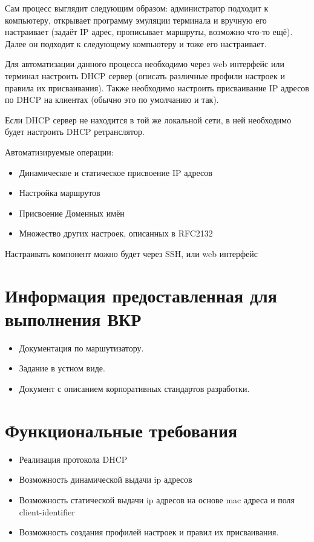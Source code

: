 \documentclass[12pt]{article}
\begin{document}
Сам процесс выглядит следующим образом:
администратор подходит к компьютеру, открывает программу эмуляции терминала и вручную его настраивает (задаёт IP адрес, прописывает маршруты, возможно что-то ещё). Далее он подходит к следующему компьютеру и тоже его настраивает.

Для автоматизации данного процесса необходимо через web интерфейс или терминал настроить DHCP сервер (описать различные профили настроек и правила их присваивания). Также необходимо настроить присваивание IP адресов по DHCP на клиентах (обычно это по умолчанию и так).

Если DHCP сервер не находится в той же локальной сети, в ней необходимо будет настроить DHCP ретранслятор.


Автоматизируемые операции:
\begin{itemize}
    \item Динамическое и статическое присвоение IP адресов
    \item Настройка маршрутов
    \item Присвоение Доменных имён
    \item Множество других настроек, описанных в RFC2132
\end{itemize}

Настраивать компонент можно будет через SSH, или web интерфейс

\section{Информация предоставленная для выполнения ВКР}
\begin{itemize}
    \item Документация по маршутизатору.
    \item Задание в устном виде.
    \item Документ с описанием корпоративных стандартов разработки.
\end{itemize}

\section{Функциональные требования}
\begin{itemize}
    \item Реализация протокола DHCP
    \item Возможность динамической выдачи ip адресов
    \item Возможность статической выдачи ip адресов на основе mac адреса и поля client-identifier
    \item Возможность создания профилей настроек и правил их присваивания.
\end{itemize}
    
\end{document}
